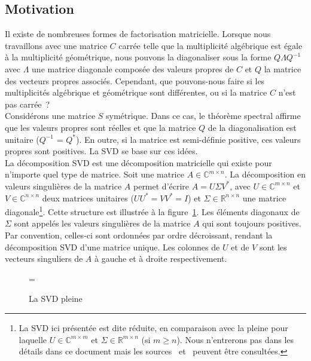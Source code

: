 \documentclass[a4paper, 11pt]{article}
\newlength\matfield
\newlength\tmplength
\def\matscale{1.}
\newcommand\dimbox[3]{
  \setlength\matfield{\matscale\baselineskip}
  \setbox0=\hbox{\vphantom{X}\smash{#3}}
  \setlength{\tmplength}{#1\matfield-\ht0-\dp0}
  \fboxrule=1pt\fboxsep=-\fboxrule\relax
  \fbox{\makebox[#2\matfield]{\addstackgap[.5\tmplength]{\box0}}}
}
\newcommand\matbox[5]{
  \stackunder{\dimbox{#1}{#2}{$#5$}}{\scriptstyle(#3\times #4)}
}
\begin{document}
\subsection{Motivation}\label{subsec:motivation}
\noindent Il existe de nombreuses formes de factorisation matricielle. Lorsque nous travaillons avec une matrice $C$ carrée telle que la multiplicité algébrique est égale à la multiplicité géométrique, nous pouvons la diagonaliser sous la forme $Q \Lambda Q^{-1}$ avec $\Lambda$ une matrice diagonale composée des valeurs propres de $C$ et $Q$ la matrice des vecteurs propres associés. Cependant, que pouvons-nous faire si les multiplicités algébrique et géométrique sont différentes, ou si la matrice $C$ n'est pas carrée~?\\
Considérons une matrice $S$ symétrique. Dans ce cas, le théorème spectral affirme que les valeurs propres sont réelles et que la matrice $Q$ de la diagonalisation est unitaire ($Q^{-1}$ = $Q^*$). En outre, si la matrice est semi-définie positive, ces valeurs propres sont positives. La SVD se base sur ces idées.\\
La décomposition SVD est une décomposition matricielle qui existe pour n'importe quel type de matrice. Soit une matrice $A \in {\mathbb{C}}^{m \times n}$. La décomposition en valeurs singulières de la matrice $A$ permet d'écrire $A = U \Sigma V^*$, avec $U \in \mathbb{C}^{m \times n}$ et $V \in \mathbb{C}^{n \times n}$ deux matrices unitaires ($UU^* = VV^* = I$) et $\Sigma \in \mathbb{R}^{n \times n}$ une matrice diagonale\footnote{La SVD ici présentée est dite réduite, en comparaison avec la pleine pour laquelle $U \in \mathbb{C}^{m \times m}$ et $\Sigma \in \mathbb{R}^{m \times n}$ (si $m \geq n$). Nous n'entrerons pas dans les détails dans ce document mais les sources~\cite{trefethen} et~\cite{strang} peuvent être consultées.}. Cette structure est illustrée à la figure~\ref{fig:SVD_full}. Les éléments diagonaux de $\Sigma$ sont appelés les valeurs singulières de la matrice $A$ qui sont toujours positives. Par convention, celles-ci sont ordonnées par ordre décroissant, rendant la décomposition SVD d'une matrice unique. Les colonnes de $U$ et de $V$ sont les vecteurs singuliers de $A$ à gauche et à droite respectivement.

\begin{figure}[!htb]
    \centering
    \matbox{3}{2}{m}{n}{A} = \matbox{3}{3}{m}{m}{U} \matbox{3}{2}{m}{n}{\Sigma} \matbox{2}{2}{n}{n}{V\textsuperscript{T}}
    \caption{La SVD pleine}
    \label{fig:SVD_full}
\end{figure}
\end{document}
